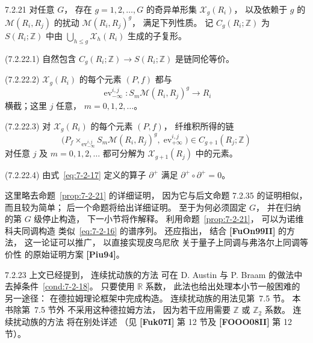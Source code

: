 \begin{proposition}{7.2.21}\label{prop:7-2-21}
对任意 $G$，
存在 $g=1,2,\ldots,G$
的奇异单形集
$\mathcal X_g(R_i)$，
以及依赖于 $g$ 的
$\mathcal M(R_i,R_j)$
的扰动
$\mathcal M(R_i,R_j)^g$，
满足下列性质。
记 $C_g(R_i;\mathbb Z)$ 为
$S(R_i;\mathbb Z)$
中由
$\bigcup_{h\le g}\mathcal X_h(R_i)$
生成的子复形。

\noindent\textup{(7.2.22.1)}\quad
自然包含
$C_g(R_i;\mathbb Z)
\to S(R_i;\mathbb Z)$
是链同伦等价。

\noindent\textup{(7.2.22.2)}\quad
$\mathcal X_g(R_i)$
的每个元素 $(P,f)$
都与
\[
\operatorname{ev}^{i,j}_{-\infty}
\colon S_m\mathcal M(R_i,R_j)^g
\longrightarrow R_i
\]
横截；这里 $j$ 任意，
$m=0,1,2,\ldots$。

\noindent\textup{(7.2.22.3)}\quad
对 $\mathcal X_g(R_i)$
的每个元素 $(P,f)$，
纤维积所得的链
\[
\bigl(
P_f\mathop{\times}_{\operatorname{ev}^{i,j}_{-\infty}}
S_m\mathcal M(R_i,R_j)^g,
\operatorname{ev}^{i,j}_{+\infty}
\bigr)
\in C_{g+1}(R_j;\mathbb Z)
\]
对任意 $j$ 及
$m=0,1,2,\ldots$
都可分解为
$\mathcal X_{g+1}(R_j)$
中的元素。

\noindent\textup{(7.2.22.4)}\quad
由式~\eqref{eq:7-2-17}
定义的算子 $\partial^+$
满足 $\partial^+\circ\partial^+=0$。
\end{proposition}

这里略去命题~\ref{prop:7-2-21}
的详细证明，
因为它与后文命题 7.2.35 的证明相似，
而且较为简单；
后一个命题将给出详细证明。
至于为何必须固定 $G$，
并在归纳的第 $G$ 级停止构造，
下一小节将作解释。
利用命题~\ref{prop:7-2-21}，
可以为诺维科夫同调构造
类似~\eqref{eq:7-2-16}
的谱序列。
还应指出，
结合 \textbf{[FuOn99II]} 的方法，
这一论证可以推广，
以直接实现皮乌尼欣
关于量子上同调与弗洛尔上同调等价性
的原始证明方案 \textbf{[Piu94]}。

\begin{remark}{7.2.23}\label{rem:7-2-23}
上文已经提到，
连续扰动族的方法
可在 D. Austin 与 P. Braam 的做法中
去掉条件~\ref{cond:7-2-18}。
只要使用 $\mathbb R$ 系数，
此法也给出处理本小节一般困难的
另一途径：
在德拉姆理论框架中完成构造。
连续扰动族的用法见第~7.5 节。
本书除第~7.5 节外
不采用这种德拉姆方法，
因为若干应用需要
$\mathbb Z$ 或 $\mathbb Z_2$ 系数。
连续扰动族的方法
将在别处详述
（见 \textbf{[Fuk07I]} 第 12 节及
\textbf{[FOOO08II]} 第 12 节）。
\end{remark}
